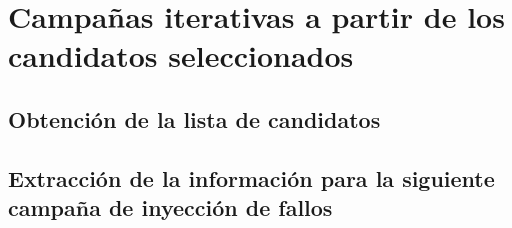 \chapter{Campañas iterativas a partir de los candidatos seleccionados}
\label{ch:CampanasIterativas}

\lettrine[lraise=-0.1, lines=2, loversize=0.2]{}{}





\section{Obtención de la lista de candidatos}
\label{sec:Candidatos}



\section{Extracción de la información para la siguiente campaña de inyección de
fallos}
\label{sec:InfoCampana}


